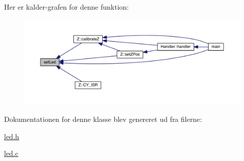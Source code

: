 Her er kalder-\/grafen for denne funktion\+:
\nopagebreak
\begin{figure}[H]
\begin{center}
\leavevmode
\includegraphics[width=350pt]{d3/dbe/class_l_e_d_a1d8e725e3829da99c1d027ba0a2ce57a_icgraph}
\end{center}
\end{figure}




Dokumentationen for denne klasse blev genereret ud fra filerne\+:\begin{DoxyCompactItemize}
\item 
\hyperlink{led_8h}{led.\+h}\item 
\hyperlink{led_8c}{led.\+c}\end{DoxyCompactItemize}
